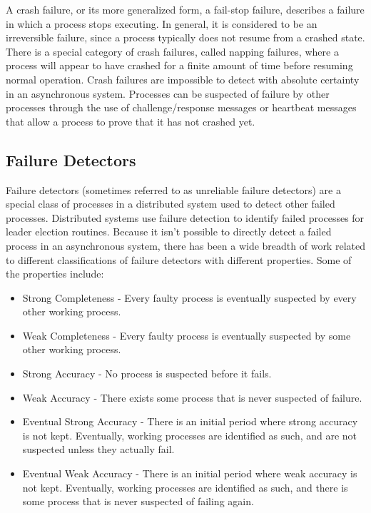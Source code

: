 A crash failure, or its more generalized form, a fail-stop failure, describes a failure in which a process stops executing.
In general, it is considered to be an irreversible failure, since a process typically does not resume from a crashed state.
There is a special category of crash failures, called napping failures, where a process will appear to have crashed for a finite amount of time before resuming normal operation.
Crash failures are impossible to detect with absolute certainty in an asynchronous system\cite{DISTRIBUTED}.
Processes can be suspected of failure by other processes through the use of challenge/response messages or heartbeat messages that allow a process to prove that it has not crashed yet.
%

\subsection{Failure Detectors}

Failure detectors\cite{FAILUREDETECTORS} (sometimes referred to as unreliable failure detectors) are a special class of processes in a distributed system used to detect other failed processes.
Distributed systems use failure detection to identify failed processes for leader election routines.
Because it isn't possible to directly detect a failed process in an asynchronous system, there has been a wide breadth of work related to different classifications of failure detectors with different properties.
Some of the properties include\cite{FAILUREDETECTORS}:

\begin{itemize}
    \item Strong Completeness - Every faulty process is eventually suspected by
        every other working process.
    \item Weak Completeness - Every faulty process is eventually suspected by 
        some other working process.
    \item Strong Accuracy - No process is suspected before it fails.
    \item Weak Accuracy - There exists some process that is never suspected of failure.
    \item Eventual Strong Accuracy - There is an initial period where strong accuracy is not kept. Eventually, working processes are identified as such, and are not suspected unless they actually fail.
    \item Eventual Weak Accuracy - There is an initial period where weak accuracy is not kept. Eventually, working processes are identified as such, and there is some process that is never suspected of failing again.
\end{itemize} 

